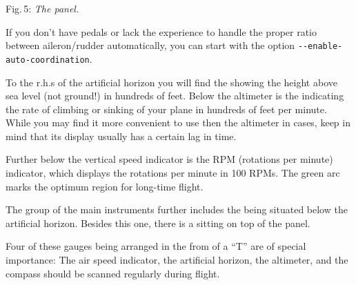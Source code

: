  \centerline{}

\smallskip
 \noindent
Fig.\,5: \textit{The panel.}
\medskip

If you don't have pedals or lack the experience to handle the proper
ratio between aileron/rudder automatically, you can start \FlightGear{}
with the option \texttt{-$ $-enable-auto-coordination}.

To the r.h.s of the artificial horizon you will find the  showing the height
above sea level (not ground!) in hundreds of feet.  Below the altimeter is the
 indicating the rate of climbing or sinking of your plane
in hundreds of feet per minute. While you may find it more convenient to use then the
altimeter in cases, keep in mind that its display usually has a certain lag in time.

Further below the vertical speed indicator is the RPM (rotations per minute)
indicator, which displays the rotations per minute  in 100 RPMs. The
green arc marks the optimum region for long-time flight.

The group of the main instruments further includes the  being
situated below the artificial horizon. Besides this one, there is a  sitting on top of the panel.

Four of these gauges being arranged in the from of a ``T'' are of special importance: The
air speed indicator, the artificial horizon, the altimeter, and the compass should be
scanned regularly during flight.

